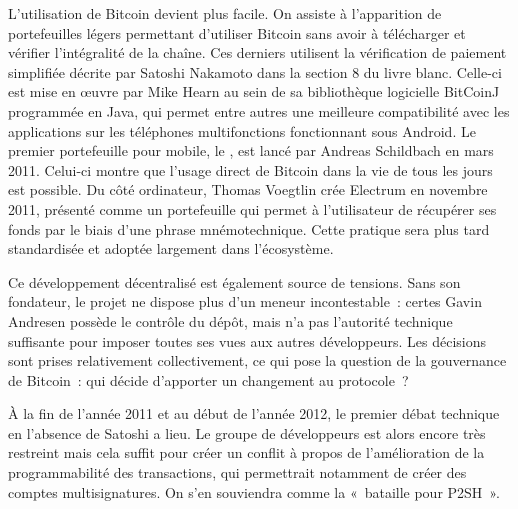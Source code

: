 L'utilisation de Bitcoin devient plus facile. On assiste à l'apparition de portefeuilles légers permettant d'utiliser Bitcoin sans avoir à télécharger et vérifier l'intégralité de la chaîne. Ces derniers utilisent la vérification de paiement simplifiée décrite par Satoshi Nakamoto dans la section 8 du livre blanc. Celle-ci est mise en œuvre par Mike Hearn au sein de sa bibliothèque logicielle BitCoinJ programmée en Java, qui permet entre autres une meilleure compatibilité avec les applications sur les téléphones multifonctions fonctionnant sous Android. Le premier portefeuille pour mobile, le , est lancé par Andreas Schildbach en mars 2011. Celui-ci montre que l'usage direct de Bitcoin dans la vie de tous les jours est possible. Du côté ordinateur, Thomas Voegtlin crée Electrum en novembre 2011, présenté comme un portefeuille qui permet à l'utilisateur de récupérer ses fonds par le biais d'une phrase mnémotechnique. Cette pratique sera plus tard standardisée et adoptée largement dans l'écosystème.


Ce développement décentralisé est également source de tensions. Sans son fondateur, le projet ne dispose plus d'un meneur incontestable~: certes Gavin Andresen possède le contrôle du dépôt, mais n'a pas l'autorité technique suffisante pour imposer toutes ses vues aux autres développeurs. Les décisions sont prises relativement collectivement, ce qui pose la question de la gouvernance de Bitcoin~: qui décide d'apporter un changement au protocole~?

À la fin de l'année 2011 et au début de l'année 2012, le premier débat technique en l'absence de Satoshi a lieu. Le groupe de développeurs est alors encore très restreint mais cela suffit pour créer un conflit à propos de l'amélioration de la programmabilité des transactions, qui permettrait notamment de créer des comptes multisignatures. On s'en souviendra comme la «~bataille pour P2SH~».


